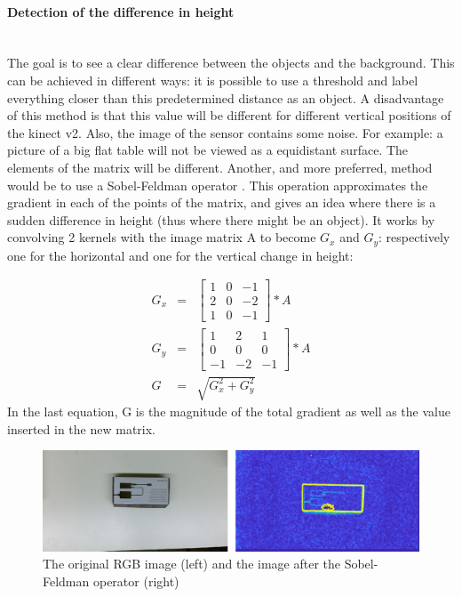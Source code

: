 \documentclass[11pt]{article}
\begin{document}
\paragraph{Detection of the difference in height}\mbox{}\\
The goal is to see a clear difference between the objects and the background. This can be achieved in different ways: it is possible to use a threshold and label everything closer than this predetermined distance as an object. A disadvantage of this method is that this value will be different for different vertical positions of the kinect v2. Also, the image of the sensor contains some noise. For example: a picture of a big flat table will not be viewed as a equidistant surface. The elements of the matrix will be different. Another, and more preferred, method would be to use a Sobel-Feldman operator \cite{Sobel_operator}. This operation approximates the gradient in each of the points of the matrix, and gives an idea where there is a sudden difference in height (thus where there might be an object). It works by convolving 2 kernels with the image matrix A to become $G_{x}$ and $G_{y}$: respectively one for the horizontal and one for the vertical change in height: 

\begin{eqnarray*}
G_{x} &=& 
	\begin{bmatrix}
		1&0&-1\\
		2&0&-2\\
		1&0&-1
	\end{bmatrix}
	*A \\
G_{y} &=& 
	\begin{bmatrix}
		1&2&1\\
		0&0&0\\
		-1&-2&-1
	\end{bmatrix}
	*A\\
G &=& \sqrt{G_{x}^2+G_{y}^2}
\end{eqnarray*}
In the last equation, G is the magnitude of the total gradient as well as the value inserted in the new matrix.

\begin{figure}[h]
	\center
  \includegraphics[width=1\linewidth]{original_and_sobel.png}
  \caption{The original RGB image (left) and the image after the Sobel-Feldman operator (right)}
  \label{fig:Moore_Neighbor}
\end{figure}
\end{document}
